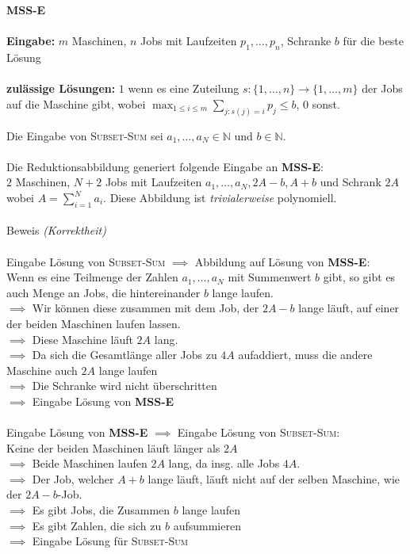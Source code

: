 
\begin{framed}
\textbf{MSS-E}\\ \ \\
\textbf{Eingabe:} $m$ Maschinen, $n$ Jobs mit Laufzeiten $p_1, \dots, p_n$, Schranke $b$ für die beste Lösung\\ \ \\
\textbf{zulässige Lösungen:} $1$ wenn es eine Zuteilung $s: \{1, \dots, n\} \to \{1, \dots, m\}$ der Jobs auf die Maschine gibt, wobei $\max_{1\leq i\leq m} \sum_{j:s(j)=i} p_j \leq b$, $0$ sonst.
\end{framed}

Die Eingabe von \textsc{Subset-Sum} sei $a_1, \dots, a_N \in \mathbb{N}$ und $b \in \mathbb{N}$.\\ \ \\
Die Reduktionsabbildung generiert folgende Eingabe an \textbf{MSS-E}:\\
$2$ Maschinen, $N + 2$ Jobs mit Laufzeiten $a_1, \dots, a_N, 2A - b, A + b$ und Schrank $2A$ wobei
$A=\sum_{i=1}^N a_i$. Diese Abbildung ist \textit{trivialerweise} polynomiell.\\ \ \\

Beweis \textit{(Korrektheit)} \\ \ \\
Eingabe Lösung von \textsc{Subset-Sum} $\implies$ Abbildung auf Lösung von \textbf{MSS-E}:\\
Wenn es eine Teilmenge der Zahlen $a_1, \dots, a_N$ mit Summenwert $b$ gibt, so gibt es auch Menge an Jobs, die hintereinander $b$ lange laufen.\\
$\implies$
Wir können diese zusammen mit dem Job, der $2A - b$ lange läuft, auf einer der beiden Maschinen laufen lassen.\\
$\implies$
Diese Maschine läuft $2A$ lang.\\
$\implies$ Da sich die Gesamtlänge aller Jobs zu $4A$ aufaddiert, muss die andere Maschine auch $2A$ lange laufen\\
$\implies$ Die Schranke wird nicht überschritten\\
$\implies$ Eingabe Lösung von \textbf{MSS-E}
\\ \ \\
Eingabe Lösung von \textbf{MSS-E} $\implies$ Eingabe Lösung von \textsc{Subset-Sum}:\\
Keine der beiden Maschinen läuft länger als $2A$\\
$\implies$ Beide Maschinen laufen $2A$ lang, da insg. alle Jobs $4A$.\\
$\implies$ Der Job, welcher $A + b$ lange läuft, läuft nicht auf der selben Maschine, wie der $2A - b$-Job.\\
$\implies$ Es gibt Jobs, die Zusammen $b$ lange laufen\\
$\implies$ Es gibt Zahlen, die sich zu $b$ aufsummieren\\
$\implies$ Eingabe Lösung für \textsc{Subset-Sum}
